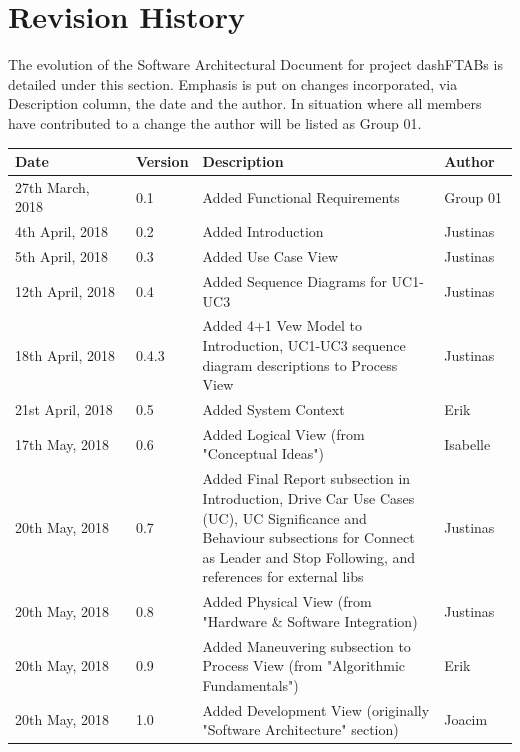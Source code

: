 \documentclass[12pt]{article}
\begin{document}
\section{Revision History} \label{sec:history}
The evolution of the Software Architectural Document for project dashFTABs is detailed under this section. Emphasis is put on changes incorporated, via Description column, the date and the author. In situation where all members have contributed to a change the author will be listed as Group 01.
\begin{longtable}{ | p{0.25\linewidth} | p{0.1\linewidth} | p{0.5\linewidth} | p{0.15\linewidth} | }\hline 
    \textbf{Date} & \textbf{Version} & \textbf{Description} & \textbf{Author} \\ \hline
   	27th March, 2018 & 0.1 & Added Functional Requirements & Group 01\\ \hline
   	4th April, 2018 & 0.2 & Added Introduction & Justinas\\ \hline
   	5th April, 2018 & 0.3 & Added Use Case View & Justinas\\ \hline
   	12th April, 2018 & 0.4 & Added Sequence Diagrams for UC1-UC3 & Justinas\\ \hline
	18th April, 2018 & 0.4.3 & Added 4+1 Vew Model to Introduction, UC1-UC3 sequence diagram descriptions to Process View & Justinas\\ \hline
	21st April, 2018 & 0.5 & Added System Context & Erik\\ \hline
    
    \rowcolor{blue!80!red!30} %
	17th May, 2018 & 0.6 & Added Logical View (from "Conceptual Ideas") & Isabelle\\ \hline
    20th May, 2018 & 0.7 & Added Final Report subsection in Introduction, Drive Car Use Cases (UC), UC Significance and Behaviour subsections for Connect as Leader and Stop Following, and references for external libs & Justinas\\ \hline 
    
    \rowcolor{blue!80!red!30} %
    20th May, 2018 & 0.8 & Added Physical View (from "Hardware \& Software Integration)& Justinas\\ \hline 
    
    \rowcolor{blue!80!red!30} %
    20th May, 2018 & 0.9 & Added Maneuvering subsection to Process View (from "Algorithmic Fundamentals") & Erik\\  \hline
    
    \rowcolor{blue!80!red!30} %
    20th May, 2018 & 1.0 & Added Development View (originally "Software Architecture" section) & Joacim\\ \hline
\end{longtable}
\end{document}
